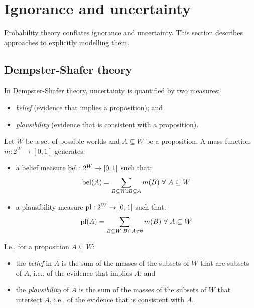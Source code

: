 \section{Ignorance and uncertainty}

Probability theory conflates ignorance and uncertainty.
This section describes approaches to explicitly modelling them.

\subsection{Dempster-Shafer theory}

In Dempster-Shafer theory, uncertainty is quantified by two measures:

\begin{itemize}
  \item \textit{belief} (evidence that implies a proposition); and
  \item \textit{plausibility} (evidence that is consistent with a proposition).
\end{itemize}

\begin{dfn}
  \label{def:4:BeliefPlausibility}
  Let $W$ be a set of possible worlds and $A \subseteq W$ be a proposition.
  A mass function $m : 2^W \to [0, 1]$ generates:
  \begin{itemize}
    \item a belief measure $\operatorname*{bel} : 2^W \to [0, 1]$ such that:
          \begin{equation}
            \label{eqn:4:Belief}
            \operatorname*{bel}(A) =
            \sum_{B \subseteq W : B \subseteq A} m(B)
            \ \forall\
            A \subseteq W
          \end{equation}
    \item a plausibility measure $\operatorname*{pl} : 2^W \to [0, 1]$ such that:
          \begin{equation}
            \label{eqn:4:Plausibility}
            \operatorname*{pl}(A) =
            \sum_{B \subseteq W : B \cap A \neq \emptyset} m(B)
            \ \forall\
            A \subseteq W
          \end{equation}
  \end{itemize}
\end{dfn}

I.e., for a proposition $A \subseteq W$:

\begin{itemize}
  \item the \textit{belief} in $A$ is the sum of the masses of the subsets of
        $W$ that are subsets of $A$, i.e., of the evidence that implies $A$; and
  \item the \textit{plausibility} of $A$ is the sum of the masses of the subsets
        of $W$ that intersect $A$, i.e., of the evidence that is consistent with
        $A$.
\end{itemize}

